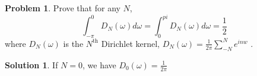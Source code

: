 \documentclass[10pt]{article}
\theoremstyle{plain}
\theoremstyle{definition}
\newtheorem{prob}{Problem}
\newtheorem*{soln*}{Solution}
\numberwithin{equation}{section}
\begin{document}
\hrulefill

\begin{prob}
    Prove that for any $N$,
    \[
            \int_{-\pi}^0  D_N(\omega) d\omega
        =   \int_{0}^{pi}  D_N(\omega) d\omega = \frac{1}{2}
    \]
    where $D_N(\omega)$ is the $N^{\text{th}}$ Dirichlet kernel,
    $\displaystyle D_N(\omega) = \frac{1}{2\pi}\sum_{-N}^N e^{inw}$\,\,.
\end{prob}
\begin{soln*}
    If  $N = 0$, we have $\displaystyle D_0(\omega) = \frac{1}{2\pi}$
    \begin{align*}
    \end{align*}
\end{soln*}
\end{document}

